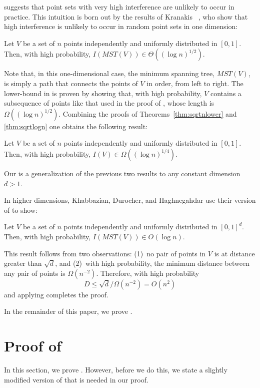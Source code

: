 \documentclass{patmorin}
\newcommand{\mst}{\mathit{MST}}
\begin{document}
 suggests that point sets with very high interference are
unlikely to occur in practice.  This intuition is born out by the results
of Kranakis \etal\ \cite{kkmns10}, who show that high interference is
unlikely to occur in random point sets in one dimension:
\begin{thm}
  Let $V$ be a set of $n$ points independently and uniformly distributed
  in $[0,1]$.  Then, with high probability, $I(\mst(V))\in \Theta((\log
  n)^{1/2})$.
\end{thm}
Note that, in this one-dimensional case, the minimum spanning tree,
$\mst(V)$, is simply a path that connects the points of $V$ in order,
from left to right.  The lower-bound in  is proven
by showing that, with high probability, $V$ contains a subsequence
of points like that used in the proof of ,
whose length is $\Omega((\log n)^{1/2})$.  Combining the proofs of
Theorems~\ref{thm:sqrtnlower} and \ref{thm:sqrtlogn} one obtains the
following result:
\begin{thm}
  Let $V$ be a set of $n$ points independently and uniformly distributed
  in $[0,1]$.  Then, with high probability, $I(V)\in \Omega((\log
  n)^{1/4})$.
\end{thm}
Our  is a generalization of the previous two results to
any constant dimension $d>1$.

In higher dimensions, Khabbazian, Durocher, and Haghnegahdar use their
version of  to show:
\begin{thm}
  Let $V$ be a set of $n$ points independently and uniformly distributed
  in $[0,1]^d$.  Then, with high probability, $I(\mst(V))\in O(\log n)$.
\end{thm}
This result follows from two observations: (1)~no pair of points in $V$
is at distance greater than $\sqrt{d}$, and (2)~with high probability,
the minimum distance between any pair of points is $\Omega(n^{-2})$.  Therefore,
with high probability
\[
   D \le \sqrt{d}/\Omega(n^{-2}) = O(n^2)
\]
and applying  completes the proof.

In the remainder of this paper, we prove .

\section{Proof of }

In this section, we prove .  However, before we do this,
we state a slightly modified version of  that is needed in
our proof.
\end{document}
